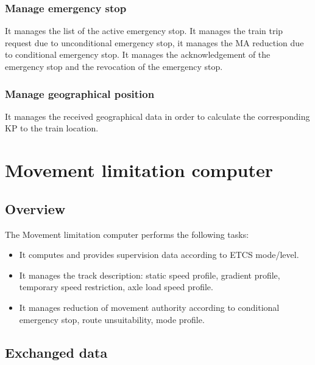 \documentclass[nocc]{template/openetcs_report}
\begin{document}
\subsection{Manage emergency stop}
It manages the list of the active emergency stop.
It manages the train trip request due to unconditional emergency stop, it manages the MA reduction due to conditional emergency stop.
It manages the acknowledgement of the emergency stop and the revocation of the emergency stop.

\subsection{Manage geographical position}
It manages the received geographical data in order to calculate the corresponding KP to the train location.

\chapter{Movement limitation computer}
\section{Overview}
The Movement limitation computer performs the following tasks:
\begin{itemize}
\item	It computes and provides supervision data according to ETCS mode/level.
\item	It manages the track description: static speed profile, gradient profile, temporary speed restriction, axle load speed profile.
\item	It manages reduction of movement authority according to conditional emergency stop, route unsuitability, mode profile. 
\end{itemize}
\section{Exchanged data}
\end{document}
